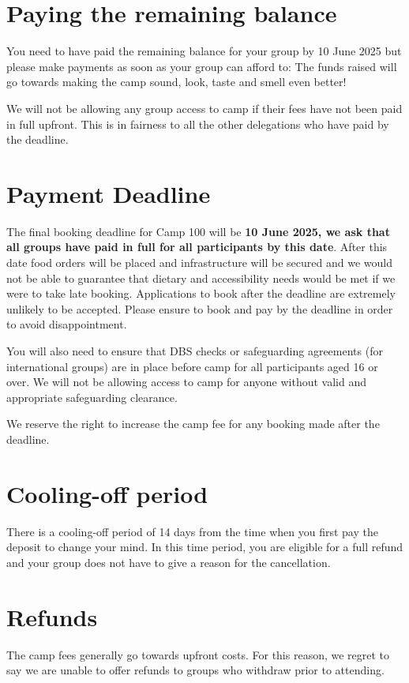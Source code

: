 \documentclass[a4paper, 11pt]{report}
\begin{document}
\section{Paying the remaining balance}
You need to have paid the remaining balance for your group by 10 June 2025 but please make payments as soon as your group can afford to: The funds raised will go towards making the camp sound, look, taste and smell even better! 

We will not be allowing any group access to camp if their fees have not been paid in full upfront. This is in fairness to all the other delegations who have paid by the deadline.

\section{Payment Deadline}
The final booking deadline for Camp 100 will be \textbf{10 June 2025, we ask that all groups have paid in full for all participants by this date}. After this date food orders will be placed and infrastructure will be secured and we would not be able to guarantee that dietary and accessibility needs would be met if we were to take late booking. Applications to book after the deadline are extremely unlikely to be accepted. Please ensure to book and pay by the deadline in order to avoid disappointment. 

You will also need to ensure that DBS checks or safeguarding agreements (for international groups) are in place before camp for all participants aged 16 or over. We will not be allowing access to camp for anyone without valid and appropriate safeguarding clearance. 

We reserve the right to increase the camp fee for any booking made after the deadline.

\section{Cooling-off period}
There is a cooling-off period of 14 days from the time when you first pay the deposit to change your mind. In this time period, you are eligible for a full refund and your group does not have to give a reason for the cancellation. 

\section{Refunds}
The camp fees generally go towards upfront costs.  For this reason, we regret to say we are unable to offer refunds to groups who withdraw prior to attending. 
\end{document}

